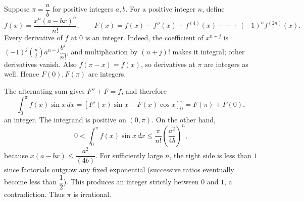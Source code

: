 Suppose $\pi=\dfrac{a}{b}$ for positive integers $a,b$. For a positive integer $n$, define
\[
f(x)=\dfrac{x^n(a-bx)^n}{n!},\qquad
F(x)=f(x)-f''(x)+f^{(4)}(x)-\cdots+(-1)^n f^{(2n)}(x).
\]
Every derivative of $f$ at $0$ is an integer. Indeed, the coefficient of $x^{n+j}$ is $(-1)^j\binom nj a^{n-j}\dfrac{b^j}{n!}$, and multiplication by $(n+j)!$ makes it integral; other derivatives vanish. Also $f(\pi-x)=f(x)$, so derivatives at $\pi$ are integers as well. Hence $F(0),F(\pi)$ are integers.

The alternating sum gives $F''+F=f$, and therefore
\[
\int_0^\pi f(x)\sin x\,dx
=[F'(x)\sin x-F(x)\cos x]_0^\pi=F(\pi)+F(0),
\]
an integer. The integrand is positive on $(0,\pi)$. On the other hand,
\[
0<\int_0^\pi f(x)\sin x\,dx
\le\dfrac{\pi}{n!}\left(\dfrac{a^2}{4b}\right)^n,
\]
because $x(a-bx)\le \dfrac{a^2}{(4b)}$. For sufficiently large $n$, the right side is less than $1$ since factorials outgrow any fixed exponential (successive ratios eventually become less than $\dfrac{1}{2}$). This produces an integer strictly between $0$ and $1$, a contradiction. Thus $\pi$ is irrational.
